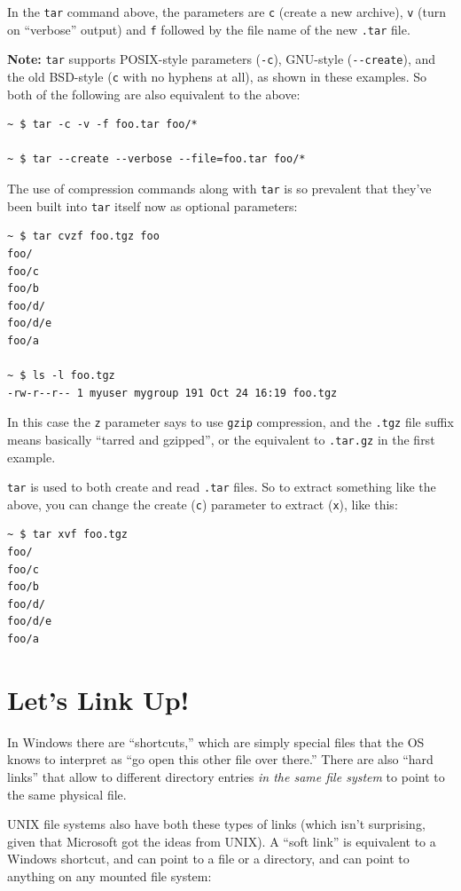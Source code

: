 \documentclass[10pt,]{book}
\numberwithin{figure}{chapter}
\begin{document}
In the \texttt{tar} command above, the parameters are \texttt{c} (create
a new archive), \texttt{v} (turn on ``verbose'' output) and \texttt{f}
followed by the file name of the new \texttt{.tar} file.

\textbf{Note:} \texttt{tar} supports POSIX-style parameters
(\texttt{-c}), GNU-style (\texttt{-{}-create}), and the old BSD-style
(\texttt{c} with no hyphens at all), as shown in these examples. So both
of the following are also equivalent to the above:

\begin{verbatim}
~ $ tar -c -v -f foo.tar foo/*

~ $ tar --create --verbose --file=foo.tar foo/*
\end{verbatim}

The use of compression commands along with \texttt{tar} is so prevalent
that they've been built into \texttt{tar} itself now as optional
parameters:

\begin{verbatim}
~ $ tar cvzf foo.tgz foo
foo/
foo/c
foo/b
foo/d/
foo/d/e
foo/a

~ $ ls -l foo.tgz
-rw-r--r-- 1 myuser mygroup 191 Oct 24 16:19 foo.tgz
\end{verbatim}

In this case the \texttt{z} parameter says to use \texttt{gzip}
compression, and the \texttt{.tgz} file suffix means basically ``tarred
and gzipped'', or the equivalent to \texttt{.tar.gz} in the first
example.

\texttt{tar} is used to both create and read \texttt{.tar} files. So to
extract something like the above, you can change the create (\texttt{c})
parameter to extract (\texttt{x}), like this:

\begin{verbatim}
~ $ tar xvf foo.tgz
foo/
foo/c
foo/b
foo/d/
foo/d/e
foo/a
\end{verbatim}

\section{Let's Link Up!}\label{lets-link-up}

In Windows there are ``shortcuts,'' which are simply special files that
the OS knows to interpret as ``go open this other file over there.''
There are also ``hard links'' that allow to different directory entries
\emph{in the same file system} to point to the same physical file.

UNIX file systems also have both these types of links (which isn't
surprising, given that Microsoft got the ideas from UNIX). A ``soft
link'' is equivalent to a Windows shortcut, and can point to a file or a
directory, and can point to anything on any mounted file system:
\end{document}
